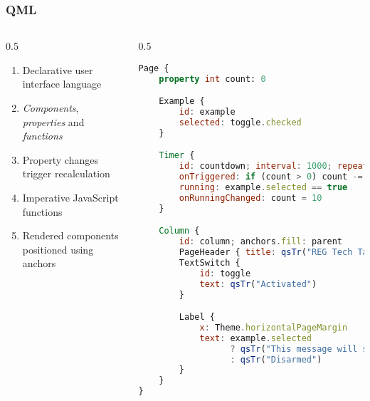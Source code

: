 \documentclass[
	notes=none,
	aspectratio=169
]{beamer}
\begin{document}
\begin{frame}[fragile]
\frametitle{QML}

\begin{columns}[T]
\begin{column}[T]{0.5\textwidth}
\setlength{\parskip}{0.5em}

\vspace{1.0cm}
\begin{enumerate}
\setlength{\parskip}{0.5em}
\item Declarative user interface language
\item {\it Components\/}, {\it properties\/} and {\it functions\/}
\item Property changes trigger recalculation
\item Imperative JavaScript functions
\item Rendered components positioned using anchors
\end{enumerate}

\end{column}
\begin{column}[T]{0.5\textwidth}

\vspace{-0.2cm}
\begin{lstlisting}[language=QML]
Page {
    property int count: 0

    Example {
        id: example
        selected: toggle.checked
    }

    Timer {
        id: countdown; interval: 1000; repeat: true
        onTriggered: if (count > 0) count -= 1
        running: example.selected == true
        onRunningChanged: count = 10
    }

    Column {
        id: column; anchors.fill: parent
        PageHeader { title: qsTr("REG Tech Talk Example") }
        TextSwitch {
            id: toggle
            text: qsTr("Activated")
        }

        Label {
            x: Theme.horizontalPageMargin
            text: example.selected
                  ? qsTr("This message will self destruct in %1 seconds".arg(count))
                  : qsTr("Disarmed")
        }
    }
}
\end{lstlisting}
\end{column}
\end{columns}

\end{frame}
\note{
}

\end{document}

